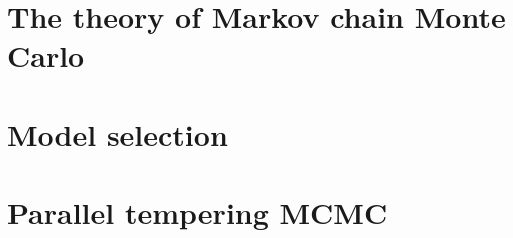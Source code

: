 \documentclass [12pt,letter]{article}
\theoremstyle{plain}
\theoremstyle{plain}
\theoremstyle{definition}
\theoremstyle{definition}
\numberwithin{equation}{section}
\begin{document}
\section{The theory of Markov chain Monte Carlo}
\label{sec:mcmc}


\pagebreak

\section{Model selection}
\label{sec:model_selection}



\pagebreak


\section{Parallel tempering MCMC}
\label{sec:parallel_tempering}


%
%
%
%
% 
\end{document}
